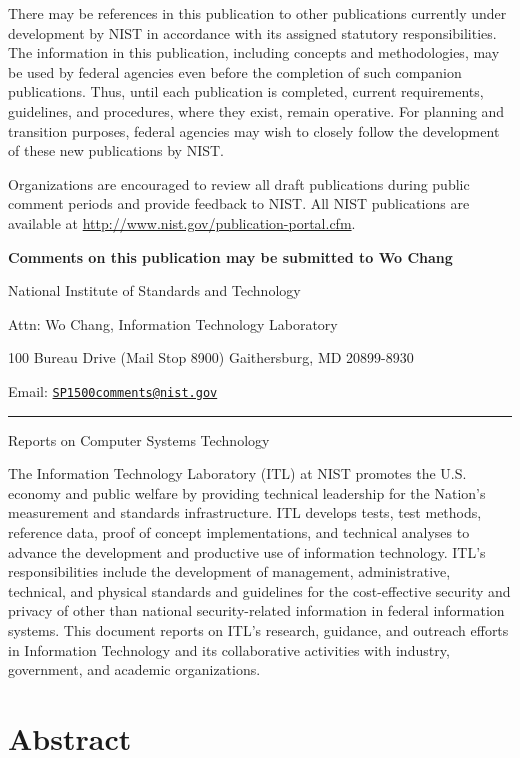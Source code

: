 \documentclass[9pt,]{article}
\begin{document}
There may be references in this publication to other publications
currently under development by NIST in accordance with its assigned
statutory responsibilities. The information in this publication,
including concepts and methodologies, may be used by federal agencies
even before the completion of such companion publications. Thus, until
each publication is completed, current requirements, guidelines, and
procedures, where they exist, remain operative. For planning and
transition purposes, federal agencies may wish to closely follow the
development of these new publications by NIST.

Organizations are encouraged to review all draft publications during
public comment periods and provide feedback to NIST. All NIST
publications are available at
\url{http://www.nist.gov/publication-portal.cfm}.

\textbf{Comments on this publication may be submitted to Wo Chang}

National Institute of Standards and Technology

Attn: Wo Chang, Information Technology Laboratory

100 Bureau Drive (Mail Stop 8900) Gaithersburg, MD 20899-8930

Email:
\href{mailto:SP1500comments@nist.gov}{\nolinkurl{SP1500comments@nist.gov}}

\begin{center}\rule{0.5\linewidth}{\linethickness}\end{center}

Reports on Computer Systems Technology

The Information Technology Laboratory (ITL) at NIST promotes the U.S.
economy and public welfare by providing technical leadership for the
Nation's measurement and standards infrastructure. ITL develops tests,
test methods, reference data, proof of concept implementations, and
technical analyses to advance the development and productive use of
information technology. ITL's responsibilities include the development
of management, administrative, technical, and physical standards and
guidelines for the cost-effective security and privacy of other than
national security-related information in federal information systems.
This document reports on ITL's research, guidance, and outreach efforts
in Information Technology and its collaborative activities with
industry, government, and academic organizations.

\hypertarget{abstract}{%
\section{Abstract}\label{abstract}}
\end{document}
